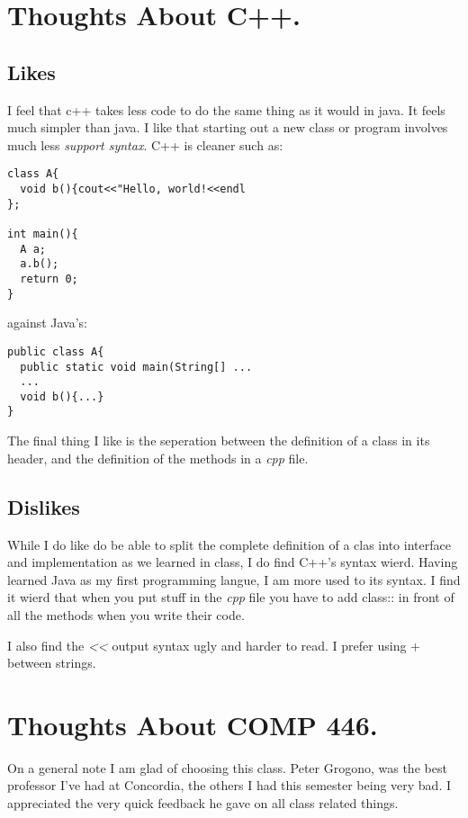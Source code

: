 \documentclass[12pt]{article}
\begin{document}
\section{Thoughts About C++.}
\subsection{Likes}
I feel that c++ takes less code to do the same thing as it would in java.  It feels much simpler than java.  I like that starting out a new class or program involves much less \emph{support syntax}. C++ is cleaner such as:

\begin{verbatim}
class A{
  void b(){cout<<"Hello, world!<<endl
};

int main(){
  A a;
  a.b();
  return 0;
}
\end{verbatim}

against Java's:

\begin{verbatim}
public class A{
  public static void main(String[] ...
  ...
  void b(){...}
}
\end{verbatim}

The final thing I like is the seperation between the definition of a class in its header, and the definition of the methods in a \emph{cpp} file.

\subsection{Dislikes}
While I do like do be able to split the complete definition of a clas into
interface and implementation as we learned in class, I do find C++'s syntax
wierd.  Having learned Java as my first programming langue, I am more used to
its syntax.  I find it wierd that when you put stuff in the \emph{cpp} file you
have to add class:: in front of all the methods when you write their code.

I also find the \textit{<<} output syntax ugly and harder to read.  I prefer using + between strings.

\section{Thoughts About COMP 446.}

On a general note I am glad of choosing this class.  Peter Grogono, was the
best professor I've had at Concordia, the others I had this semester being very
bad. I appreciated the very quick feedback he gave on all class related things.
\end{document}

